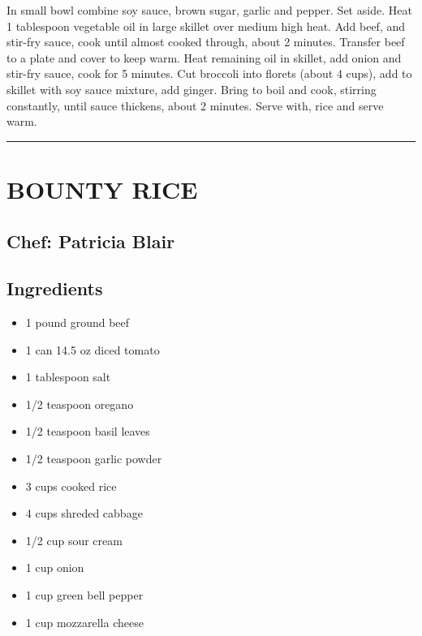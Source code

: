 \documentclass[
]{book}
\providecommand{\tightlist}{%
  \setlength{\itemsep}{0pt}\setlength{\parskip}{0pt}}
\begin{document}
In small bowl combine soy sauce, brown sugar, garlic and pepper. Set aside. Heat 1 tablespoon vegetable oil in large skillet over medium high heat. Add beef, and stir-fry sauce, cook until almost cooked through, about 2 minutes. Transfer beef to a plate and cover to keep warm. Heat remaining oil in skillet, add onion and stir-fry sauce, cook for 5 minutes. Cut broccoli into florets (about 4 cups), add to skillet with soy sauce mixture, add ginger. Bring to boil and cook, stirring constantly, until sauce thickens, about 2 minutes. Serve with, rice and serve warm.

\begin{center}\rule{0.5\linewidth}{0.5pt}\end{center}

\hypertarget{bounty-rice}{%
\section*{BOUNTY RICE}\label{bounty-rice}}


\hypertarget{chef-patricia-blair-10}{%
\subsection*{Chef: Patricia Blair}\label{chef-patricia-blair-10}}


\hypertarget{ingredients-45}{%
\subsection*{Ingredients}\label{ingredients-45}}


\begin{itemize}
\tightlist
\item
  1 pound ground beef
\item
  1 can 14.5 oz diced tomato
\item
  1 tablespoon salt
\item
  1/2 teaspoon oregano
\item
  1/2 teaspoon basil leaves
\item
  1/2 teaspoon garlic powder
\item
  3 cups cooked rice
\item
  4 cups shreded cabbage
\item
  1/2 cup sour cream
\item
  1 cup onion
\item
  1 cup green bell pepper
\item
  1 cup mozzarella cheese
\end{itemize}
\end{document}
